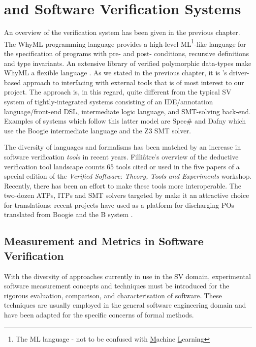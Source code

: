 \section{\why and Software Verification Systems}
\label{sec:lrsv}

An overview of the \why verification system \cite{why:shephard,why:whereprovers} has been given in the previous chapter. The WhyML programming language provides a high-level ML\footnote{The ML language - not to be confused with \underline{M}achine \underline{L}earning}-like language for the specification of programs with pre- and post- conditions, recursive definitions and type invariants. An extensive library of verified polymorphic data-types make WhyML a flexible language \cite{verifythis,why:polymorphic}. As we stated in the previous chapter, it is \why's driver-based approach to interfacing with external tools that is of most interest to our project. The \why approach is, in this regard, quite different from the typical SV system of tightly-integrated systems consisting of an IDE/annotation language/front-end DSL, intermediate logic language, and SMT-solving back-end. Examples of systems which follow this latter model are Spec\# \cite{spec} and Dafny \cite{Dafny} which use the Boogie \cite{Boogie} intermediate language and the Z3 \cite{Z3} SMT solver.

The diversity of languages and formalisms has been matched by an increase in software verification \textit{tools} in recent years. Filli{\^a}tre's overview of the deductive verification tool landscape \cite{deductiveSV} counts 65 tools cited or used in the five papers of a special edition of the \textit{Verified Software: Theory, Tools and Experiments} workshop. Recently, there has been an effort to make these tools more interoperable. The two-dozen ATPs, ITPs and SMT solvers targeted by \why make it an attractive choice for translations: recent projects have used \why as a platform for discharging POs translated from Boogie \cite{b2w} and the B system \cite{rodinplugin,atelierB2w}. 

\subsection{Measurement and Metrics in Software Verification}
\label{sub:lrsvmm}

With the diversity of approaches currently in use in the SV domain, experimental software measurement concepts and techniques must be introduced for the rigorous evaluation, comparison, and characterisation of software. These techniques are usually employed in the general software engineering domain and have been adapted for the specific concerns of formal methods. 

